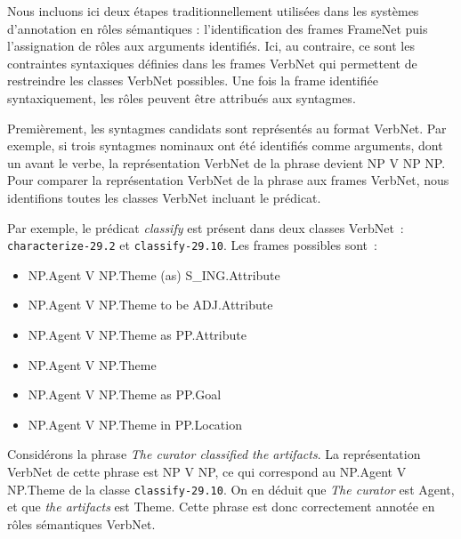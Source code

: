 Nous incluons ici deux étapes traditionnellement utilisées dans les systèmes
d'annotation en rôles sémantiques \citep{gildea2002automatic,das2014frame} :
l'identification des frames FrameNet puis l'assignation de rôles aux arguments
identifiés. Ici, au contraire, ce sont les contraintes syntaxiques définies
dans les frames VerbNet qui permettent de restreindre les classes VerbNet
possibles. Une fois la frame identifiée syntaxiquement, les rôles peuvent être
attribués aux syntagmes.

Premièrement, les syntagmes candidats sont représentés au format VerbNet. Par
exemple, si trois syntagmes nominaux ont été identifiés comme arguments, dont
un avant le verbe, la représentation VerbNet de la phrase devient NP V NP NP.
Pour comparer la représentation VerbNet de la phrase aux frames VerbNet, nous
identifions toutes les classes VerbNet incluant le prédicat.

Par exemple, le prédicat \emph{classify} est présent dans deux classes
VerbNet~: \texttt{characterize-29.2} et \texttt{classify-29.10}. Les frames
possibles sont~:

\begin{itemize}
    \item NP.Agent V NP.Theme (as) S\_ING.Attribute
    \item NP.Agent V NP.Theme to be ADJ.Attribute
    \item NP.Agent V NP.Theme as PP.Attribute
    \item NP.Agent V NP.Theme
    \item NP.Agent V NP.Theme as PP.Goal
    \item NP.Agent V NP.Theme in PP.Location
\end{itemize}

Considérons la phrase \emph{The curator classified the artifacts}. La
représentation VerbNet de cette phrase est NP V NP, ce qui correspond au
NP.Agent V NP.Theme de la classe \texttt{classify-29.10}. On en déduit que
\emph{The curator} est Agent, et que \emph{the artifacts} est Theme. Cette
phrase est donc correctement annotée en rôles sémantiques VerbNet.

